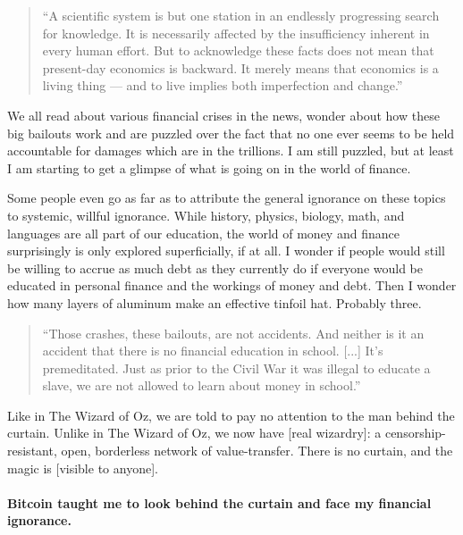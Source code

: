 \begin{quotation}
``A scientific system is but one station in an endlessly progressing
search for knowledge. It is necessarily affected by the insufficiency
inherent in every human effort. But to acknowledge these facts does
not mean that present-day economics is backward. It merely means that
economics is a living thing --- and to live implies both imperfection
and change.''
\end{quotation}

We all read about various financial crises in the news, wonder about how
these big bailouts work and are puzzled over the fact that no one ever
seems to be held accountable for damages which are in the trillions. I
am still puzzled, but at least I am starting to get a glimpse of what is
going on in the world of finance.

Some people even go as far as to attribute the general ignorance on
these topics to systemic, willful ignorance. While history, physics,
biology, math, and languages are all part of our education, the world of
money and finance surprisingly is only explored superficially, if at
all. I wonder if people would still be willing to accrue as much debt as
they currently do if everyone would be educated in personal finance and
the workings of money and debt. Then I wonder how many layers of
aluminum make an effective tinfoil hat. Probably three.

\begin{quotation}
``Those crashes, these bailouts, are not accidents. And neither is it
an accident that there is no financial education in school. [...]
It's premeditated. Just as prior to the Civil War it was illegal to
educate a slave, we are not allowed to learn about money in school.''
\end{quotation}

Like in The Wizard of Oz, we are told to pay no attention to the man
behind the curtain. Unlike in The Wizard of Oz, we now have [real
wizardry]: a censorship-resistant, open, borderless network of
value-transfer. There is no curtain, and the magic is [visible to
anyone].

\paragraph{Bitcoin taught me to look behind the curtain and face my financial
ignorance.}

